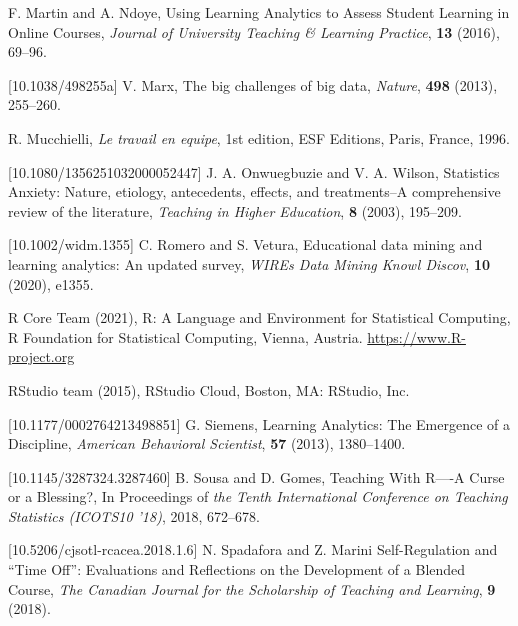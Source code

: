 \documentclass{aims}
\theoremstyle{definition}
\begin{document}
\begin{thebibliography}{99}
     \newblock  F. Martin and A. Ndoye,
     \newblock Using Learning Analytics to Assess Student Learning in Online Courses,
     \newblock \emph{Journal of University Teaching \& Learning Practice}, \textbf{13} (2016), 69--96.

 [10.1038/498255a]
     \newblock  V. Marx,
     \newblock The big challenges of big data,
     \newblock \emph{Nature}, \textbf{498} (2013), 255--260.

     \newblock R. Mucchielli,
     \newblock \emph{Le travail en equipe},
     \newblock 1st edition, ESF Editions, Paris, France, 1996.

 [10.1080/1356251032000052447]
     \newblock J. A. Onwuegbuzie  and V. A. Wilson,
     \newblock Statistics Anxiety: Nature, etiology, antecedents, effects, and treatments--A comprehensive review of the literature,
     \newblock \emph{Teaching in Higher Education}, \textbf{8} (2003), 195--209.

 [10.1002/widm.1355]
     \newblock C. Romero and S. Vetura,
     \newblock Educational data mining and learning analytics: An updated survey,
     \newblock \emph{WIREs Data Mining Knowl Discov}, \textbf{10} (2020), e1355.

     \newblock R Core Team (2021),
     \newblock R: A Language and Environment for Statistical Computing,
     \newblock R Foundation for
  Statistical Computing, Vienna, Austria. \url{
  https://www.R-project.org}

     \newblock RStudio team (2015),
     \newblock RStudio Cloud,
     \newblock Boston, MA: RStudio, Inc.

 [10.1177/0002764213498851]
     \newblock G. Siemens,
     \newblock Learning Analytics: The Emergence of a Discipline,
     \newblock \emph{American Behavioral Scientist}, \textbf{57} (2013), 1380--1400.

 [10.1145/3287324.3287460]
     \newblock B. Sousa and D. Gomes,
     \newblock Teaching With R—-A Curse or a Blessing?,
     \newblock In Proceedings of \emph{the Tenth International Conference on Teaching Statistics (ICOTS10 '18)}, 2018, 672–678.

 [10.5206/cjsotl-rcacea.2018.1.6]
     \newblock N. Spadafora and Z. Marini
     \newblock Self-Regulation and “Time Off”: Evaluations and Reflections on the Development of a Blended Course,
     \newblock \emph{The Canadian Journal for the Scholarship of Teaching and Learning}, \textbf{9} (2018).


\end{thebibliography}
\end{document}
